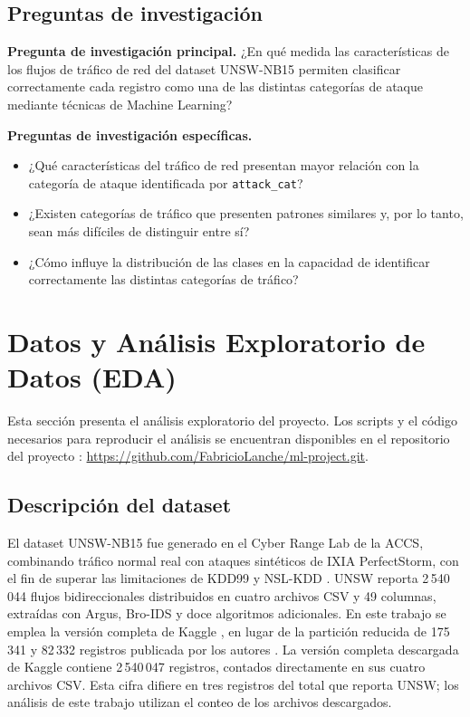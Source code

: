 \documentclass[conference]{IEEEtran}
\begin{document}
\subsection{Preguntas de investigación}

\noindent\textbf{Pregunta de investigación principal.}
¿En qué medida las características de los flujos de tráfico de red del dataset UNSW-NB15 permiten clasificar correctamente cada registro como una de las distintas categorías de ataque mediante técnicas de Machine Learning?

\noindent\textbf{Preguntas de investigación específicas.}
\begin{itemize}
    \item ¿Qué características del tráfico de red presentan mayor relación con la categoría de ataque identificada por \texttt{attack\_cat}?
    \item ¿Existen categorías de tráfico que presenten patrones similares y, por lo tanto, sean más difíciles de distinguir entre sí?
    \item ¿Cómo influye la distribución de las clases en la capacidad de identificar correctamente las distintas categorías de tráfico?
\end{itemize}



\clearpage
\section{Datos y Análisis Exploratorio de Datos (EDA)}

Esta sección presenta el análisis exploratorio del proyecto. Los scripts y el código necesarios para reproducir el análisis se encuentran disponibles en el repositorio del proyecto \cite{repo}: \url{https://github.com/FabricioLanche/ml-project.git}.

\subsection{Descripción del dataset}

El dataset UNSW-NB15 \cite{moustafa2015unsw} fue generado en el Cyber Range Lab de la ACCS, combinando tráfico normal real con ataques sintéticos de IXIA PerfectStorm, con el fin de superar las limitaciones de KDD99 y NSL-KDD \cite{moustafa2016evaluation}. 
UNSW reporta 2\,540\,044 flujos bidireccionales distribuidos en cuatro archivos CSV y 49 columnas, extraídas con Argus, Bro-IDS y doce algoritmos adicionales. En este trabajo se emplea la versión completa de Kaggle \cite{kaggle_unsw}, en lugar de la partición reducida de 175\,341 y 82\,332 registros publicada por los autores \cite{moustafa2016evaluation}. La versión completa descargada de Kaggle contiene 2\,540\,047 registros, contados directamente en sus cuatro archivos CSV. Esta cifra difiere en tres registros del total que reporta UNSW; los análisis de este trabajo utilizan el conteo de los archivos descargados.
\end{document}
